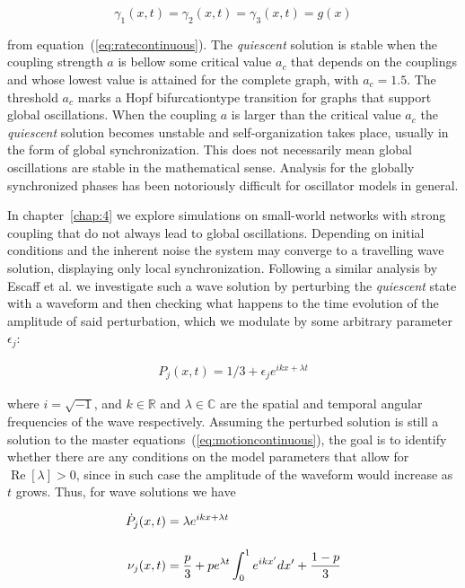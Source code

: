 $$\gamma_1(x,t) = \gamma_2(x,t) = \gamma_3(x,t)=g(x)$$

\noindent from equation~(\ref{eq:ratecontinuous}). The \textit{quiescent} solution is stable when the coupling strength $a$ is bellow
some critical value $a_c$ that depends on the couplings and whose lowest value is attained for the complete graph, with $a_c=1.5$. The
threshold $a_c$ marks a Hopf bifurcation\footnotemark type transition for graphs that support global
oscillations\cite{Wood06a}\cite{rodrigues2020synchronization}\cite{Wood06b}\cite{Wood07b}. When the coupling $a$ is larger than the
critical value $a_c$ the \textit{quiescent} solution becomes unstable and self-organization takes place, usually in the form of global
synchronization. This does not necessarily mean global oscillations are stable in the mathematical sense. Analysis for the globally
synchronized phases has been notoriously difficult for oscillator models in general.


In chapter~\ref{chap:4} we explore simulations on small-world networks with strong coupling that do not always lead to global
oscillations. Depending on initial conditions and the inherent noise the system may converge to a travelling wave solution, displaying
only local synchronization. Following a similar analysis by Escaff et al.\cite{escaff2014arrays} we investigate such a wave solution by
perturbing the \textit{quiescent} state with a waveform and then checking what happens to the time evolution of the amplitude of said
perturbation, which we modulate by some arbitrary parameter $\epsilon_j$:

\begin{align}
    P_j(x,t) = 1/3 + \epsilon_j e^{ikx + \lambda t}
\end{align}

\noindent where $i=\sqrt{-1}$, and $k\in\mathbb{R}$ and $\lambda\in\mathbb{C}$ are the spatial and temporal angular frequencies of the
wave respectively.  Assuming the perturbed solution is still a solution to the master equations~(\ref{eq:motioncontinuous}), the goal
is to identify whether there are any conditions on the model parameters that allow for $\operatorname{Re}[\lambda]>0$, since in such
case the amplitude of the waveform would increase as $t$ grows. Thus, for wave solutions we have

\begin{align}
    \dot{P}_j(x,t) &= \lambda e^{ikx + \lambda t} \\[12pt]
    \nu_j(x,t) &= \frac{p}{3} + pe^{\lambda t}\int_0^1 e^{ikx'} dx' + \frac{1-p}{3}
\end{align}
